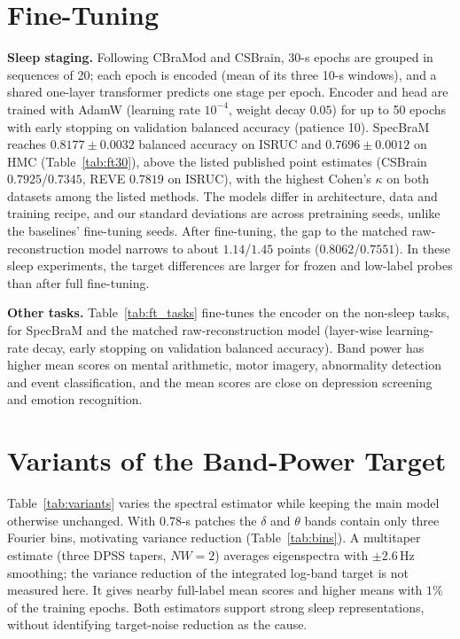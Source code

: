 \section{Fine-Tuning}\label{app:fttasks}

\noindent\textbf{Sleep staging.} Following CBraMod and CSBrain, 30-s epochs are grouped in
sequences of 20; each epoch is encoded (mean of its three 10-s windows), and a shared one-layer
transformer predicts one stage per epoch. Encoder and head are trained with AdamW (learning
rate $10^{-4}$, weight decay $0.05$) for up to 50 epochs with early stopping on validation
balanced accuracy (patience 10). SpecBraM reaches $0.8177{\pm}0.0032$ balanced accuracy on
ISRUC and $0.7696{\pm}0.0012$ on HMC (Table~\ref{tab:ft30}), above the listed published point estimates
(CSBrain $0.7925$/$0.7345$, REVE $0.7819$ on ISRUC), with the highest Cohen's $\kappa$ on both
datasets among the listed methods. The models differ in architecture, data and training recipe, and our standard
deviations are across pretraining seeds, unlike the baselines' fine-tuning seeds. After
fine-tuning, the gap to the matched raw-reconstruction model narrows to about $1.14$/$1.45$ points
($0.8062$/$0.7551$). In these sleep experiments, the target differences are larger for frozen
and low-label probes than after full fine-tuning.


\noindent\textbf{Other tasks.} Table~\ref{tab:ft_tasks} fine-tunes the encoder on the non-sleep
tasks, for SpecBraM and the matched raw-reconstruction model (layer-wise learning-rate decay,
early stopping on validation balanced accuracy). Band power has higher mean scores on mental
arithmetic, motor imagery, abnormality detection and event classification, and the mean scores
are close on depression screening and emotion recognition.

\section{Variants of the Band-Power Target}\label{app:variants}

Table~\ref{tab:variants} varies the spectral estimator while keeping the main model otherwise
unchanged. With $0.78$-s patches the $\delta$ and $\theta$ bands contain only
three Fourier bins, motivating variance reduction (Table~\ref{tab:bins}). A multitaper estimate
(three DPSS tapers, $NW{=}2$) averages eigenspectra with ${\pm}2.6$\,Hz smoothing; the variance
reduction of the integrated log-band target is not measured here. It gives nearby full-label
mean scores and higher means with $1\%$ of the training epochs. Both estimators support strong
sleep representations, without identifying target-noise reduction as the cause.

